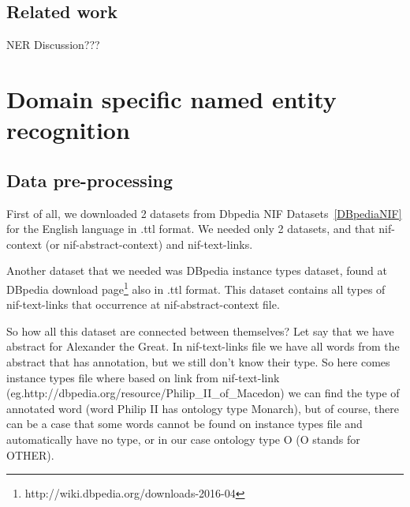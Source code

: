\documentclass[thesis=M,english]{FITthesis}[2018/05/30]
\begin{document}
\section{Related work}
NER Discussion???
\chapter{Domain specific named entity recognition}\label{}

\section{Data pre-processing}\label{dataPreProcessing}
	First of all, we downloaded 2 datasets from Dbpedia NIF Datasets~\ref{DBpediaNIF} for the English language in .ttl format. We needed only 2 datasets, and that nif-context (or nif-abstract-context) and nif-text-links.

	Another dataset that we needed was DBpedia instance types dataset, found at DBpedia download page\footnote{http://wiki.dbpedia.org/downloads-2016-04} also in .ttl format. This dataset contains all types of nif-text-links that occurrence at nif-abstract-context file.

	So how all this dataset are connected between themselves? Let say that we have abstract for Alexander the Great. In nif-text-links file we have all words from the abstract that has annotation, but we still don't know their type. So here comes instance types file where based on link from nif-text-link (eg.http://dbpedia.org/resource/Philip\_II\_of\_Macedon) we can find the type of annotated word (word Philip II has ontology type Monarch), but of course, there can be a case that some words cannot be found on instance types file and automatically have no type, or in our case ontology type O (O stands for OTHER).
\end{document}

